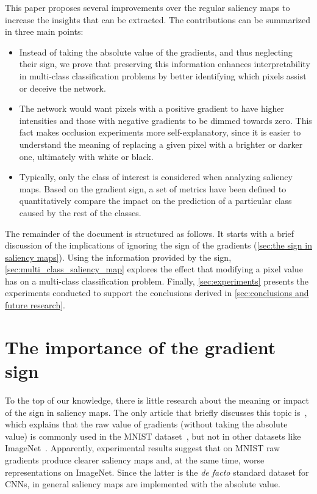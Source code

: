 \documentclass[preprint,12pt]{elsarticle}
\begin{document}
This paper proposes several improvements over the regular saliency maps to increase the insights that can be extracted. The contributions can be summarized in three main points:
\begin{itemize}
  \item Instead of taking the absolute value of the gradients, and thus neglecting their sign, we prove that preserving this information enhances interpretability in multi-class classification problems by better identifying which pixels assist or deceive the network.  
  \item The network would want pixels with a positive gradient to have higher intensities and those with negative gradients to be dimmed towards zero. This fact makes occlusion experiments more self-explanatory, since it is easier to understand the meaning of replacing a given pixel with a brighter or darker one, ultimately with white or black.
  \item Typically, only the class of interest is considered when analyzing saliency maps. Based on the gradient sign, a set of metrics have been defined to quantitatively compare the impact on the prediction of a particular class caused by the rest of the classes.
\end{itemize}

The remainder of the document is structured as follows. It starts with a brief discussion of the implications of ignoring the sign of the gradients (\autoref{sec:the sign in saliency maps}). Using the information provided by the sign, \autoref{sec:multi_class_saliency_map} explores the effect that modifying a pixel value has on a multi-class classification problem. Finally, \autoref{sec:experiments} presents the experiments conducted to support the conclusions derived in \autoref{sec:conclusions and future research}. 

\section{The importance of the gradient sign}
\label{sec:the sign in saliency maps}
To the top of our knowledge, there is little research about the meaning or impact of the sign in saliency maps. The only article that briefly discusses this topic is~\cite{Smilkov2017}, which explains that the raw value of gradients (without taking the absolute value) is commonly used in the MNIST dataset~\cite{MNISTHandwrittenDigit}, but not in other datasets like ImageNet~\cite{ImageNet}. Apparently, experimental results suggest that on MNIST raw gradients produce clearer saliency maps and, at the same time, worse representations on ImageNet. Since the latter is the \textit{de facto} standard dataset for CNNs, in general saliency maps are implemented with the absolute value.
\end{document}

